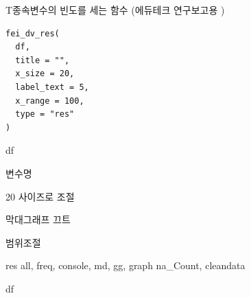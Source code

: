 \documentclass[a4paper]{book}
\begin{document}
%
\begin{Description}
T종속변수의 빈도를 세는 함수 (에듀테크 연구보고용 )
\end{Description}
%
\begin{Usage}
\begin{verbatim}
fei_dv_res(
  df,
  title = "",
  x_size = 20,
  label_text = 5,
  x_range = 100,
  type = "res"
)
\end{verbatim}
\end{Usage}
%
\begin{Arguments}
\begin{ldescription}
\item[\code{df}] df

\item[\code{title}] 변수명

\item[\code{x\_size}] 20 사이즈로 조절

\item[\code{label\_text}] 막대그래프 끄트

\item[\code{x\_range}] 범위조절

\item[\code{type}] res all, freq, console, md, gg, graph na\_Count, cleandata
\end{ldescription}
\end{Arguments}
%
\begin{Value}
df
\end{Value}
%
\begin{Examples}
\end{Examples}
\end{document}
